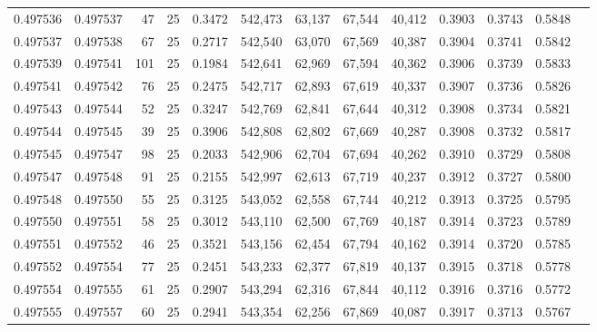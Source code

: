 \begin{tabular}{rrrrrrrrrrrrr}
0.497536 & 0.497537 &    47 &  25 &                                     0.3472 & 542,473 &  63,137 &  67,544 &  40,412 & 0.3903 & 0.3743 & 0.5848 \\
0.497537 & 0.497538 &    67 &  25 &                                     0.2717 & 542,540 &  63,070 &  67,569 &  40,387 & 0.3904 & 0.3741 & 0.5842 \\
0.497539 & 0.497541 &   101 &  25 &                                     0.1984 & 542,641 &  62,969 &  67,594 &  40,362 & 0.3906 & 0.3739 & 0.5833 \\
0.497541 & 0.497542 &    76 &  25 &                                     0.2475 & 542,717 &  62,893 &  67,619 &  40,337 & 0.3907 & 0.3736 & 0.5826 \\
0.497543 & 0.497544 &    52 &  25 &                                     0.3247 & 542,769 &  62,841 &  67,644 &  40,312 & 0.3908 & 0.3734 & 0.5821 \\
0.497544 & 0.497545 &    39 &  25 &                                     0.3906 & 542,808 &  62,802 &  67,669 &  40,287 & 0.3908 & 0.3732 & 0.5817 \\
0.497545 & 0.497547 &    98 &  25 &                                     0.2033 & 542,906 &  62,704 &  67,694 &  40,262 & 0.3910 & 0.3729 & 0.5808 \\
0.497547 & 0.497548 &    91 &  25 &                                     0.2155 & 542,997 &  62,613 &  67,719 &  40,237 & 0.3912 & 0.3727 & 0.5800 \\
0.497548 & 0.497550 &    55 &  25 &                                     0.3125 & 543,052 &  62,558 &  67,744 &  40,212 & 0.3913 & 0.3725 & 0.5795 \\
0.497550 & 0.497551 &    58 &  25 &                                     0.3012 & 543,110 &  62,500 &  67,769 &  40,187 & 0.3914 & 0.3723 & 0.5789 \\
0.497551 & 0.497552 &    46 &  25 &                                     0.3521 & 543,156 &  62,454 &  67,794 &  40,162 & 0.3914 & 0.3720 & 0.5785 \\
0.497552 & 0.497554 &    77 &  25 &                                     0.2451 & 543,233 &  62,377 &  67,819 &  40,137 & 0.3915 & 0.3718 & 0.5778 \\
0.497554 & 0.497555 &    61 &  25 &                                     0.2907 & 543,294 &  62,316 &  67,844 &  40,112 & 0.3916 & 0.3716 & 0.5772 \\
0.497555 & 0.497557 &    60 &  25 &                                     0.2941 & 543,354 &  62,256 &  67,869 &  40,087 & 0.3917 & 0.3713 & 0.5767 \\

\end{tabular}
